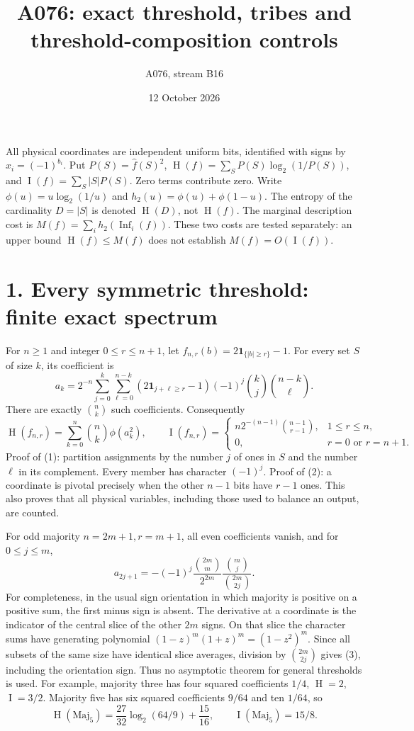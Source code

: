\documentclass[11pt]{article}
\newcommand{\I}{\operatorname{I}}
\newcommand{\HH}{\operatorname{H}}
\begin{document}
\title{A076: exact threshold, tribes and threshold-composition controls}
\author{A076, stream B16}\date{12 October 2026}\maketitle

All physical coordinates are independent uniform bits, identified with signs
by $x_i=(-1)^{b_i}$. Put $P(S)=\widehat f(S)^2$,
$\HH(f)=\sum_S P(S)\log_2(1/P(S))$, and
$\I(f)=\sum_S |S|P(S)$. Zero terms contribute zero. Write
$\phi(u)=u\log_2(1/u)$ and $h_2(u)=\phi(u)+\phi(1-u)$.
The entropy of the cardinality $D=|S|$ is denoted $\HH(D)$, not $\HH(f)$.
The marginal description cost is
$M(f)=\sum_i h_2(\operatorname{Inf}_i(f))$.
These two costs are tested separately: an upper bound $\HH(f)\le M(f)$
does not establish $M(f)=O(\I(f))$.

\section*{1. Every symmetric threshold: finite exact spectrum}
For $n\ge1$ and integer $0\le r\le n+1$, let
$f_{n,r}(b)=2\mathbf1_{\{|b|\ge r\}}-1$.
For every set $S$ of size $k$, its coefficient is
\[
 a_k=2^{-n}\sum_{j=0}^k\sum_{\ell=0}^{n-k}
 (2\mathbf1_{j+\ell\ge r}-1)(-1)^j
 {k\choose j}{n-k\choose\ell}.                         \tag{1}
\]
There are exactly ${n\choose k}$ such coefficients. Consequently
\[
 \HH(f_{n,r})=\sum_{k=0}^n {n\choose k}\phi(a_k^2),\qquad
 \I(f_{n,r})=\begin{cases}
 n2^{-(n-1)}{n-1\choose r-1},&1\le r\le n,\\
 0,&r=0\text{ or }r=n+1.
 \end{cases}                                                   \tag{2}
\]
Proof of (1): partition assignments by the number $j$ of ones in $S$
and the number $\ell$ in its complement. Every member has character
$(-1)^j$. Proof of (2): a coordinate is pivotal precisely when the
other $n-1$ bits have $r-1$ ones. This also proves that all physical
variables, including those used to balance an output, are counted.

For odd majority $n=2m+1,r=m+1$, all even coefficients vanish,
and for $0\le j\le m$,
\[
 a_{2j+1}=-(-1)^j\frac{{2m\choose m}}{2^{2m}}
                  \frac{{m\choose j}}{{2m\choose 2j}}.           \tag{3}
\]
For completeness, in the usual sign orientation in which majority
is positive on a positive sum, the first minus sign is absent.
The derivative at a coordinate is the indicator of the central
slice of the other $2m$ signs. On that slice the character sums have
generating polynomial $(1-z)^m(1+z)^m=(1-z^2)^m$.
Since all subsets of the same size have identical slice averages,
division by ${2m\choose 2j}$ gives (3), including the orientation
sign. Thus no asymptotic theorem for general thresholds is used.
For example, majority three has four squared coefficients $1/4$,
$\HH=2$, $\I=3/2$. Majority five has six squared coefficients $9/64$
and ten $1/64$, so
\[
 \HH(\mathrm{Maj}_5)=\frac{27}{32}\log_2(64/9)+\frac{15}{16},
 \qquad\I(\mathrm{Maj}_5)=15/8.                                 \tag{4}
\]
\end{document}
